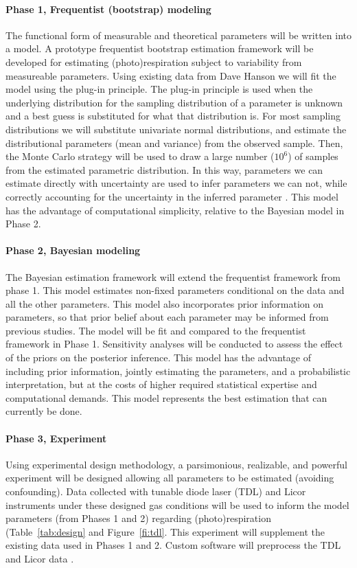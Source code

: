\documentclass[12pt]{article}
\begin{document}
\paragraph{Phase 1, Frequentist (bootstrap) modeling}
The functional form of measurable and theoretical parameters
  will be written into a model.
A prototype frequentist bootstrap estimation framework will be developed
  for estimating (photo)respiration
  subject to variability from measureable parameters.
Using existing data from Dave Hanson we will fit the model using the plug-in principle.
The plug-in principle is used when the underlying distribution
  for the sampling distribution of a parameter is unknown
  and a best guess is substituted for what that distribution is.
For most sampling distributions we will substitute univariate normal distributions,
  and estimate the distributional parameters (mean and variance) from the observed sample.
Then, the Monte Carlo strategy will be used to draw a large number ($10^6$)
  of samples from the estimated parametric distribution.
In this way, parameters we can estimate directly with uncertainty
  are used to infer parameters we can not,
  while correctly accounting for the uncertainty in the inferred parameter
  \citep{DavisonHinkley:1997:Bootstrapmethodsand}.
This model has the advantage of computational simplicity,
  relative to the Bayesian model in Phase 2.

\paragraph{Phase 2, Bayesian modeling}
The Bayesian estimation framework will extend the frequentist framework from phase 1.
This model estimates non-fixed parameters conditional on the data and all the other parameters.
This model also incorporates prior information on parameters,
  so that prior belief about each parameter may be informed from previous studies.
The model will be fit and compared to the frequentist framework in Phase 1.
Sensitivity analyses will be conducted to assess the effect of the priors on the posterior inference.
This model has the advantage of including prior information,
  jointly estimating the parameters,
  and a probabilistic interpretation,
  but at the costs of higher required statistical expertise and computational demands.
This model represents the best estimation that can currently be done.

\paragraph{Phase 3, Experiment}
Using experimental design methodology,
  a parsimonious, realizable, and powerful experiment will be designed
  allowing all parameters to be estimated (avoiding confounding).
Data collected with tunable diode laser (TDL) and Licor instruments
  under these designed gas conditions
  will be used to inform the model parameters (from Phases 1 and 2) regarding
  (photo)respiration (Table~\ref{tab:design} and Figure~\ref{fi:tdl}.
This experiment will supplement the existing data used in Phases 1 and 2.
Custom software will preprocess the TDL and Licor data
  \citep{ErhardtHanson:2011:tdllicor:estimatesdiscrimination}.
\end{document}

